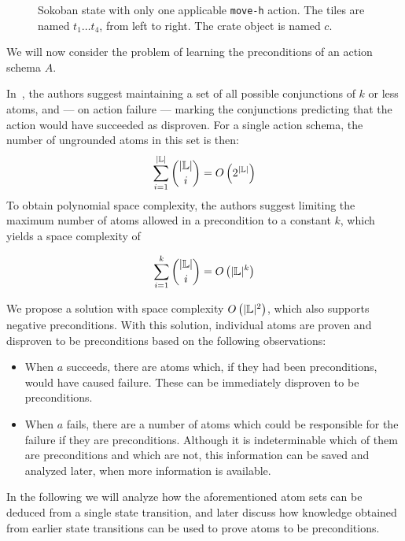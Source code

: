 \documentclass[../Master.tex]{subfiles}
\begin{document}
\begin{figure}
    \centering
    \resizebox{0.4\textwidth}{!}{}
    \caption{\label{fig:sokoSmall} Sokoban state with only one applicable \texttt{move-h} action. The tiles are named $t_1 \dots t_4$, from left to right. The crate object is named $c$.}
\end{figure}

We will now consider the problem of learning the preconditions of an action schema $A$.

In~\cite{Walsh2008}, the authors suggest maintaining a set of all possible conjunctions of $k$ or less atoms, and --- on action failure --- marking the conjunctions predicting that the action would have succeeded as disproven. For a single action schema, the number of ungrounded atoms in this set is then:
\begin{equation*}
    \sum_{i=1}^{|\mathbb{L}|} {{|\mathbb{L}|}\choose{i}} = O \left( 2^{|\mathbb{L}|} \right)
\end{equation*}
To obtain polynomial space complexity, the authors suggest limiting the maximum number of atoms allowed in a precondition to a constant $k$, which yields a space complexity of 

\begin{equation*}
    \sum_{i=1}^{k} {{|\mathbb{L}|}\choose{i}} = O \left( |\mathbb{L}|^k \right)
\end{equation*}

We propose a solution with space complexity $O \left( |\mathbb{L}|^2 \right)$, which also supports negative preconditions. With this solution, individual atoms are proven and disproven to be preconditions based on the following observations:
\begin{itemize}
    \item When $a$ succeeds, there are atoms which, if they had been preconditions, would have caused failure. These can be immediately disproven to be preconditions.
    \item When $a$ fails, there are a number of atoms which could be responsible for the failure if they are preconditions. Although it is indeterminable which of them are preconditions and which are not, this information can be saved and analyzed later, when more information is available.
\end{itemize}

In the following we will analyze how the aforementioned atom sets can be deduced from a single state transition, and later discuss how knowledge obtained from earlier state transitions can be used to prove atoms to be preconditions.
\end{document}

